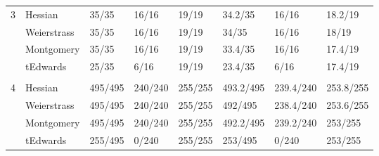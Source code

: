 \begin{table}[!h]
\begin{tabular}{llllllll}
\multicolumn{1}{|l|}{\multirow{4}{*}{3}}   & \multicolumn{1}{l|}{Hessian}                & \multicolumn{1}{l|}{35/35}   & \multicolumn{1}{l|}{16/16}   & \multicolumn{1}{l|}{19/19}   & \multicolumn{1}{l|}{34.2/35}   & \multicolumn{1}{l|}{16/16}     & \multicolumn{1}{l|}{18.2/19}   \\ \cline{2-8} 
\multicolumn{1}{|l|}{}                     & \multicolumn{1}{l|}{Weierstrass}            & \multicolumn{1}{l|}{35/35}   & \multicolumn{1}{l|}{16/16}   & \multicolumn{1}{l|}{19/19}   & \multicolumn{1}{l|}{34/35}     & \multicolumn{1}{l|}{16/16}     & \multicolumn{1}{l|}{18/19}     \\ \cline{2-8} 
\multicolumn{1}{|l|}{}                     & \multicolumn{1}{l|}{Montgomery}             & \multicolumn{1}{l|}{35/35}   & \multicolumn{1}{l|}{16/16}   & \multicolumn{1}{l|}{19/19}   & \multicolumn{1}{l|}{33.4/35}   & \multicolumn{1}{l|}{16/16}     & \multicolumn{1}{l|}{17.4/19}   \\ \cline{2-8} 
\multicolumn{1}{|l|}{}                     & \multicolumn{1}{l|}{tEdwards}               & \multicolumn{1}{l|}{25/35}   & \multicolumn{1}{l|}{6/16}    & \multicolumn{1}{l|}{19/19}   & \multicolumn{1}{l|}{23.4/35}   & \multicolumn{1}{l|}{6/16}      & \multicolumn{1}{l|}{17.4/19}   \\ \hline  \vspace{-3mm}
                                           &                                             &                              &                              &                              &                                &                                &                                \\ \hline
\multicolumn{1}{|l|}{\multirow{4}{*}{4}}   & \multicolumn{1}{l|}{Hessian}                & \multicolumn{1}{l|}{495/495} & \multicolumn{1}{l|}{240/240} & \multicolumn{1}{l|}{255/255} & \multicolumn{1}{l|}{493.2/495} & \multicolumn{1}{l|}{239.4/240} & \multicolumn{1}{l|}{253.8/255} \\ \cline{2-8} 
\multicolumn{1}{|l|}{}                     & \multicolumn{1}{l|}{Weierstrass}            & \multicolumn{1}{l|}{495/495} & \multicolumn{1}{l|}{240/240} & \multicolumn{1}{l|}{255/255} & \multicolumn{1}{l|}{492/495}   & \multicolumn{1}{l|}{238.4/240} & \multicolumn{1}{l|}{253.6/255} \\ \cline{2-8} 
\multicolumn{1}{|l|}{}                     & \multicolumn{1}{l|}{Montgomery}             & \multicolumn{1}{l|}{495/495} & \multicolumn{1}{l|}{240/240} & \multicolumn{1}{l|}{255/255} & \multicolumn{1}{l|}{492.2/495} & \multicolumn{1}{l|}{239.2/240} & \multicolumn{1}{l|}{253/255}   \\ \cline{2-8} 
\multicolumn{1}{|l|}{}                     & \multicolumn{1}{l|}{tEdwards}               & \multicolumn{1}{l|}{255/495} & \multicolumn{1}{l|}{0/240}   & \multicolumn{1}{l|}{255/255} & \multicolumn{1}{l|}{253/495}   & \multicolumn{1}{l|}{0/240}     & \multicolumn{1}{l|}{253/255}   \\ \hline
\end{tabular}
\end{table}


